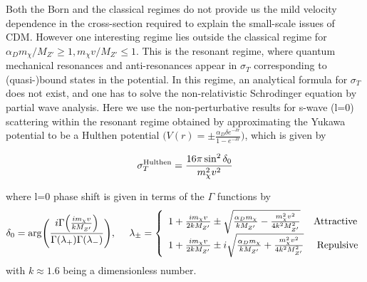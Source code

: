 \documentclass[prd,nofootinbib,preprint,superscriptaddress]{revtex4}
\begin{document}
		Both the Born and the classical regimes do not provide us the mild velocity dependence in the cross-section required to explain the small-scale issues of CDM. However one interesting regime lies outside the classical regime for $\alpha_D m_\chi/M_{Z'} \geq 1, m_\chi v/M_{Z'} \leq 1$. This is the resonant regime, where quantum mechanical resonances and anti-resonances appear in $\sigma_T$ corresponding to (quasi-)bound states in the potential. In this regime, an analytical formula for $\sigma_T$ does not exist, and one has to solve the non-relativistic Schrodinger equation by partial wave analysis. Here we use the non-perturbative results for s-wave (l=0) scattering within the resonant regime obtained by approximating the Yukawa potential to be a Hulthen potential $\Big( V(r) = \pm \frac{\alpha_D \delta e^{-\delta r}}{1-e^{-\delta r}}\Big)$, which is given by~\cite{Tulin:2013teo}
		
		\begin{equation}
			\sigma^{\rm Hulthen}_T = \frac{16 \pi \sin^2\delta_0}{m^2_\chi v^2}
		\end{equation}
		
		where l=0 phase shift is given in terms of the $\Gamma$ functions by
		\begin{equation}
			\delta_0 ={\rm arg} \Bigg(\frac{i\Gamma \Big(\frac{i m_\chi v}{k M_{Z'}}\Big)}{\Gamma (\lambda_+)\Gamma (\lambda_-)}\Bigg),~~~~ \lambda_{\pm} = \left\{
			\begin{array}{l}
				1+ \frac{i m_\chi v}{2 k M_{Z'}}  \pm \sqrt{\frac{\alpha_D m_\chi}{k M_{Z'}} - \frac{ m^2_\chi v^2}{4 k^2 M^2_{Z'}}} ~~~~ {\rm Attractive}\\
				1+ \frac{i m_\chi v}{2 k M_{Z'}}  \pm i\sqrt{\frac{\alpha_D m_\chi}{k M_{Z'}} + \frac{ m^2_\chi v^2}{4 k^2 M^2_{Z'}}} ~~~~ {\rm Repulsive}\\
			\end{array}
			\right.
		\end{equation}   
		with $k \approx 1.6$ being a dimensionless number. 
		
\end{document}
